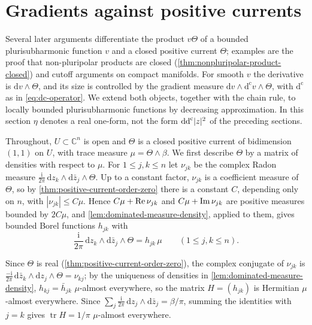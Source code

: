 \section{Gradients against positive currents}
\label{sec:bt-current-gradients}
Several later arguments differentiate the product $v\Theta$ of a bounded plurisubharmonic function $v$ and a closed positive current $\Theta$; examples are the proof that non-pluripolar products are closed (\cref{thm:nonpluripolar-product-closed}) and cutoff arguments on compact manifolds. For smooth $v$ the derivative is $\mathrm dv\wedge\Theta$, and its size is controlled by the gradient measure $\mathrm dv\wedge\mathrm d^{\mathrm c}v\wedge\Theta$, with $\mathrm d^{\mathrm c}$ as in \eqref{eq:dc-operator}. We extend both objects, together with the chain rule, to locally bounded plurisubharmonic functions by decreasing approximation. In this section $\eta$ denotes a real one-form, not the form $\mathrm{dd}^{\mathrm{c}}|z|^2$ of the preceding sections.

Throughout, $U\subset\mathbb C^n$ is open and $\Theta$ is a closed positive current of bidimension $(1,1)$ on $U$, with trace measure $\mu=\Theta\wedge\beta$. We first describe $\Theta$ by a matrix of densities with respect to $\mu$. For $1\leq j,k\leq n$ let $\nu_{jk}$ be the complex Radon measure $\frac{\mathrm i}{2\pi}\,\mathrm dz_k\wedge\mathrm d\bar z_j\wedge\Theta$. Up to a constant factor, $\nu_{jk}$ is a coefficient measure of $\Theta$, so by \cref{thm:positive-current-order-zero} there is a constant $C$, depending only on $n$, with $|\nu_{jk}|\leq C\mu$. Hence $C\mu+\operatorname{Re}\nu_{jk}$ and $C\mu+\operatorname{Im}\nu_{jk}$ are positive measures bounded by $2C\mu$, and \cref{lem:dominated-measure-density}, applied to them, gives bounded Borel functions $h_{jk}$ with
\[
 \frac{\mathrm i}{2\pi}\,\mathrm dz_k\wedge\mathrm d\bar z_j\wedge\Theta=h_{jk}\,\mu
 \qquad(1\leq j,k\leq n).
\]

Since $\Theta$ is real (\cref{thm:positive-current-order-zero}), the complex conjugate of $\nu_{jk}$ is $\frac{-\mathrm i}{2\pi}\,\mathrm d\bar z_k\wedge\mathrm dz_j\wedge\Theta=\nu_{kj}$; by the uniqueness of densities in \cref{lem:dominated-measure-density}, $h_{kj}=\bar h_{jk}$ $\mu$-almost everywhere, so the matrix $H=(h_{jk})$ is Hermitian $\mu$-almost everywhere. Since $\sum_j\frac{\mathrm i}{2\pi}\,\mathrm dz_j\wedge\mathrm d\bar z_j=\beta/\pi$, summing the identities with $j=k$ gives $\operatorname{tr}H=1/\pi$ $\mu$-almost everywhere.

